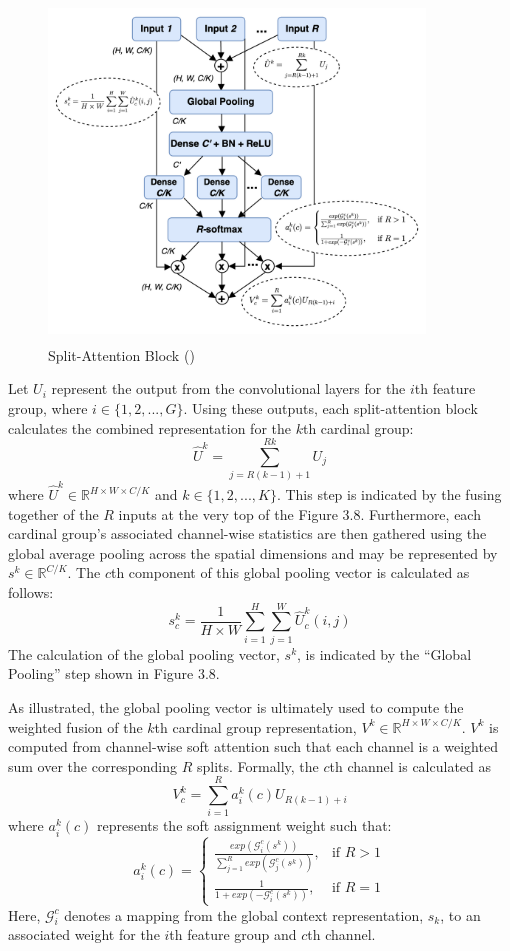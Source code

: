 \documentclass [MAS] {uclathes}
\begin{document}
\begin{figure}[h]
\centering
\includegraphics[height = 90mm, width= 100mm]{imgs/split_att.png}
\caption{Split-Attention Block (\cite{resnest})}
\label{fig:split_att_block}
\end{figure}


Let $U_i$ represent the output from the convolutional layers for the $i$th feature group, where $i \in \{1, 2, ..., G \}$. Using these outputs, each split-attention block calculates the combined representation for the $k$th cardinal group: $$\hat{U}^k = \sum_{j = R(k-1)+1}^{Rk} U_j$$ where $\hat{U}^k \in \mathbb{R}^{H \times W \times C/K}$ and $k \in \{1, 2, ..., K\}$. This step is indicated by the fusing together of the $R$ inputs at the very top of the Figure 3.8. Furthermore, each cardinal group's associated channel-wise statistics are then gathered using the global average pooling across the spatial dimensions and may be represented by $s^k \in \mathbb{R}^{C/K}$. The $c$th component of this global pooling vector is calculated as follows: $$s_{c}^{k} = \frac{1}{H \times W} \sum_{i = 1}^{H} \sum_{j = 1}^{W} \hat{U}_{c}^{k}(i, j)$$ The calculation of the global pooling vector, $s^k$, is indicated by the ``Global Pooling'' step shown in Figure 3.8. 

As illustrated, the global pooling vector is ultimately used to compute the weighted fusion of the $k$th cardinal group 
representation, $V^k \in \mathbb{R}^{H \times W \times C/K}$. $V^k$ is computed from channel-wise soft attention such that each channel is a weighted sum over the corresponding $R$ splits. Formally, the $c$th channel is calculated as $$V_{c}^{k} = \sum_{i = 1}^{R} a_{i}^{k}(c) U_{R(k-1) + i}$$ where $a_{i}^{k}(c)$ represents the soft assignment weight such that: \[  a_{i}^{k}(c)= \begin{cases} \frac{exp(\mathcal{G}_{i}^c(s^k))}{\sum_{j=1}^{R} exp(\mathcal{G}_{j}^c(s^k))}, & \text{if } R > 1\\ \frac{1}{1 + exp(-\mathcal{G}_{i}^c(s^k))}, & \text{if } R = 1 \end{cases} \] Here, $\mathcal{G}_{i}^{c}$ denotes a mapping from the global context representation, $s_k$, to an associated weight for the $i$th feature group and $c$th channel. 
\end{document}
